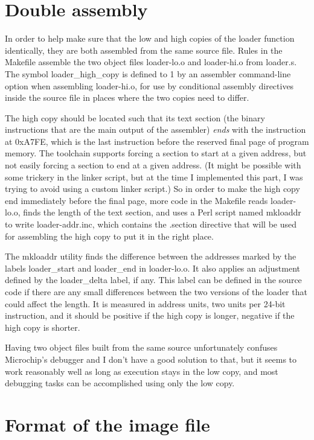 \section{Double assembly}

In order to help make sure that the low and high copies of the loader
function identically, they are both assembled from the same source file. 
Rules in the Makefile assemble the two object files loader-lo.o and
loader-hi.o from loader.s.  The symbol loader\_high\_copy is defined to 1 by
an assembler command-line option when assembling loader-hi.o, for use by
conditional assembly directives inside the source file in places where the
two copies need to differ.

The high copy should be located such that its text section (the binary
instructions that are the main output of the assembler) \emph{ends} with the
instruction at 0xA7FE, which is the last instruction before the reserved
final page of program memory.  The toolchain supports forcing a section to
start at a given address, but not easily forcing a section to end at a given
address.  (It might be possible with some trickery in the linker script, but
at the time I implemented this part, I was trying to avoid using a custom
linker script.) So in order to make the high copy end immediately before the
final page, more code in the Makefile reads loader-lo.o, finds the length of
the text section, and uses a Perl script named mkloaddr to write
loader-addr.inc, which contains the .section directive that will be used for
assembling the high copy to put it in the right place.

The mkloaddr utility finds the difference between the addresses marked by
the labels loader\_start and loader\_end in loader-lo.o.  It also applies an
adjustment defined by the loader\_delta label, if any.  This label can be
defined in the source code if there are any small differences between the
two versions of the loader that could affect the length.  It is measured in
address units, two units per 24-bit instruction, and it should be positive
if the high copy is longer, negative if the high copy is shorter.

Having two object files built from the same source unfortunately confuses
Microchip's debugger and I don't have a good solution to that, but it seems
to work reasonably well as long as execution stays in the low copy, and most
debugging tasks can be accomplished using only the low copy.

\section{Format of the image file}

